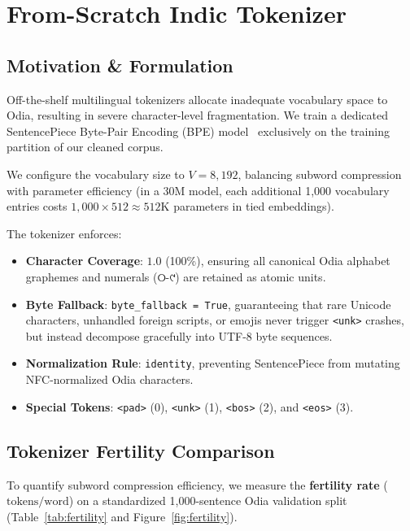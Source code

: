 \documentclass[10pt,twocolumn,letterpaper]{article}
\newcommand{\odia}[1]{{\odiafont #1}}
\newcommand{\odia}[1]{\textit{#1}}
\begin{document}
\section{From-Scratch Indic Tokenizer}

\subsection{Motivation \& Formulation}
Off-the-shelf multilingual tokenizers allocate inadequate vocabulary space to Odia, resulting in severe character-level fragmentation. We train a dedicated SentencePiece Byte-Pair Encoding (BPE) model~\cite{kudo2018sentencepiece} exclusively on the training partition of our cleaned corpus.

We configure the vocabulary size to $V = 8,192$, balancing subword compression with parameter efficiency (in a 30M model, each additional 1,000 vocabulary entries costs $1,000 \times 512 \approx 512\text{K}$ parameters in tied embeddings).

The tokenizer enforces:
\begin{itemize}
    \item \textbf{Character Coverage}: $1.0$ (100\%), ensuring all canonical Odia alphabet graphemes and numerals (\odia{୦-୯}) are retained as atomic units.
    \item \textbf{Byte Fallback}: \texttt{byte\_fallback = True}, guaranteeing that rare Unicode characters, unhandled foreign scripts, or emojis never trigger \texttt{<unk>} crashes, but instead decompose gracefully into UTF-8 byte sequences.
    \item \textbf{Normalization Rule}: \texttt{identity}, preventing SentencePiece from mutating NFC-normalized Odia characters.
    \item \textbf{Special Tokens}: \texttt{<pad>} (0), \texttt{<unk>} (1), \texttt{<bos>} (2), and \texttt{<eos>} (3).
\end{itemize}

\subsection{Tokenizer Fertility Comparison}
To quantify subword compression efficiency, we measure the \textbf{fertility rate} ($\text{tokens} / \text{word}$) on a standardized 1,000-sentence Odia validation split (Table~\ref{tab:fertility} and Figure~\ref{fig:fertility}).
\end{document}
